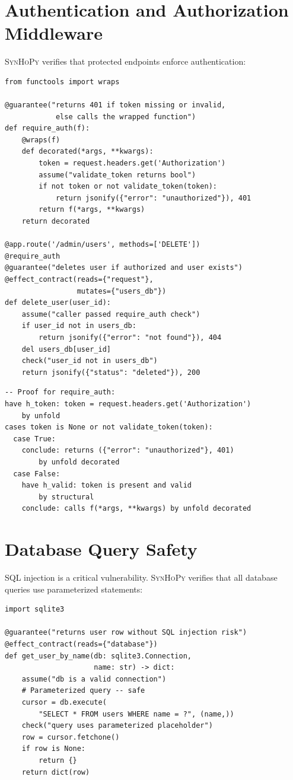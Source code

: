 \documentclass[11pt,a4paper]{report}
\theoremstyle{definition}
\theoremstyle{plain}
\newcommand{\synhopy}{\textsc{SynHoPy}}
\begin{document}
\section{Authentication and Authorization Middleware}

\synhopy{} verifies that protected endpoints enforce authentication:

\begin{lstlisting}[style=synhopy]
from functools import wraps

@guarantee("returns 401 if token missing or invalid,
            else calls the wrapped function")
def require_auth(f):
    @wraps(f)
    def decorated(*args, **kwargs):
        token = request.headers.get('Authorization')
        assume("validate_token returns bool")
        if not token or not validate_token(token):
            return jsonify({"error": "unauthorized"}), 401
        return f(*args, **kwargs)
    return decorated

@app.route('/admin/users', methods=['DELETE'])
@require_auth
@guarantee("deletes user if authorized and user exists")
@effect_contract(reads={"request"},
                 mutates={"users_db"})
def delete_user(user_id):
    assume("caller passed require_auth check")
    if user_id not in users_db:
        return jsonify({"error": "not found"}), 404
    del users_db[user_id]
    check("user_id not in users_db")
    return jsonify({"status": "deleted"}), 200
\end{lstlisting}

\begin{lstlisting}[style=proof]
-- Proof for require_auth:
have h_token: token = request.headers.get('Authorization')
    by unfold
cases token is None or not validate_token(token):
  case True:
    conclude: returns ({"error": "unauthorized"}, 401)
        by unfold decorated
  case False:
    have h_valid: token is present and valid
        by structural
    conclude: calls f(*args, **kwargs) by unfold decorated
\end{lstlisting}

\section{Database Query Safety}

SQL injection is a critical vulnerability.  \synhopy{} verifies that all
database queries use parameterized statements:

\begin{lstlisting}[style=synhopy]
import sqlite3

@guarantee("returns user row without SQL injection risk")
@effect_contract(reads={"database"})
def get_user_by_name(db: sqlite3.Connection,
                     name: str) -> dict:
    assume("db is a valid connection")
    # Parameterized query -- safe
    cursor = db.execute(
        "SELECT * FROM users WHERE name = ?", (name,))
    check("query uses parameterized placeholder")
    row = cursor.fetchone()
    if row is None:
        return {}
    return dict(row)
\end{lstlisting}
\end{document}

